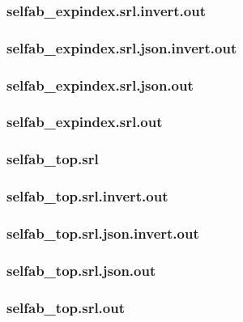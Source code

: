 \subsubsection{selfab\_expindex.srl.invert.out}
\label{app:selfab_expindex_srl.invert.out}

\subsubsection{selfab\_expindex.srl.json.invert.out}
\label{app:selfab_expindex_srl.json.invert.out}

\subsubsection{selfab\_expindex.srl.json.out}
\label{app:selfab_expindex_srl.json.out}

\subsubsection{selfab\_expindex.srl.out}
\label{app:selfab_expindex_srl.out}

\subsubsection{selfab\_top.srl}
\label{app:selfab_top_srl}

\subsubsection{selfab\_top.srl.invert.out}
\label{app:selfab_top_srl.invert.out}

\subsubsection{selfab\_top.srl.json.invert.out}
\label{app:selfab_top_srl.json.invert.out}

\subsubsection{selfab\_top.srl.json.out}
\label{app:selfab_top_srl.json.out}

\subsubsection{selfab\_top.srl.out}
\label{app:selfab_top_srl.out}

